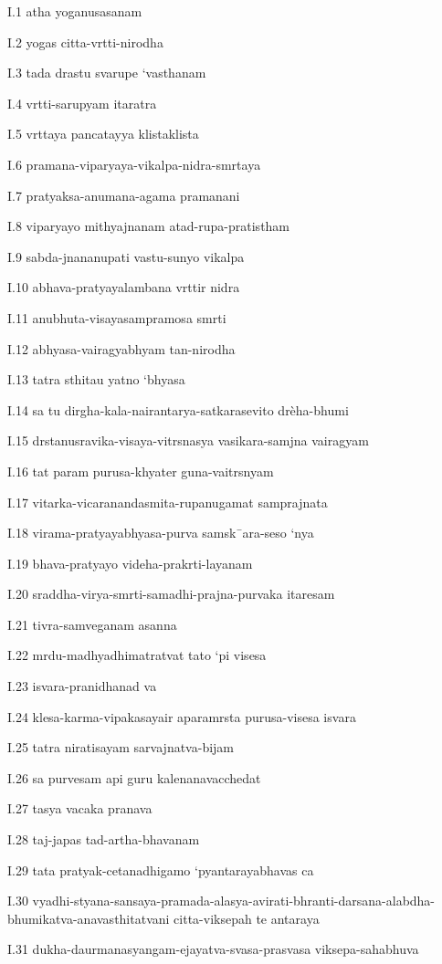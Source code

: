 I.1
atha yoganusasanam

I.2
yogas citta-vrtti-nirodha

I.3
tada drastu svarupe ‘vasthanam

I.4
vrtti-sarupyam itaratra

I.5
vrttaya pancatayya klistaklista

I.6
pramana-viparyaya-vikalpa-nidra-smrtaya

I.7
pratyaksa-anumana-agama pramanani

I.8
viparyayo mithyajnanam atad-rupa-pratistham

I.9
sabda-jnananupati vastu-sunyo vikalpa

I.10
abhava-pratyayalambana vrttir nidra

I.11
anubhuta-visayasampramosa smrti

I.12
abhyasa-vairagyabhyam tan-nirodha

I.13
tatra sthitau yatno ‘bhyasa

I.14
sa tu dirgha-kala-nairantarya-satkarasevito drèha-bhumi

I.15
drstanusravika-visaya-vitrsnasya vasikara-samjna vairagyam

I.16
tat param purusa-khyater guna-vaitrsnyam

I.17
vitarka-vicaranandasmita-rupanugamat samprajnata

I.18
virama-pratyayabhyasa-purva samsk¯ara-seso ‘nya

I.19
bhava-pratyayo videha-prakrti-layanam

I.20
sraddha-virya-smrti-samadhi-prajna-purvaka itaresam

I.21
tivra-samveganam asanna

I.22
mrdu-madhyadhimatratvat tato ‘pi visesa

I.23
isvara-pranidhanad va

I.24
klesa-karma-vipakasayair aparamrsta purusa-visesa isvara

I.25
tatra niratisayam sarvajnatva-bijam

I.26
sa purvesam api guru kalenanavacchedat

I.27
tasya vacaka pranava

I.28
taj-japas tad-artha-bhavanam

I.29
tata pratyak-cetanadhigamo ‘pyantarayabhavas ca

I.30
vyadhi-styana-sansaya-pramada-alasya-avirati-bhranti-darsana-alabdha-bhumikatva-anavasthitatvani citta-viksepah te antaraya

I.31
dukha-daurmanasyangam-ejayatva-svasa-prasvasa viksepa-sahabhuva

